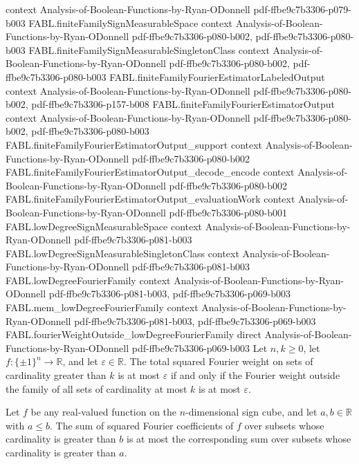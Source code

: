 \begin{theorem}
  {context}
  {Analysis-of-Boolean-Functions-by-Ryan-ODonnell}
  {pdf-ffbe9c7b3306-p079-b003}
\proofstep
  {FABL.finiteFamilySignMeasurableSpace}
  {context}
  {Analysis-of-Boolean-Functions-by-Ryan-ODonnell}
  {pdf-ffbe9c7b3306-p080-b002,
    pdf-ffbe9c7b3306-p080-b003}
\proofstep
  {FABL.finiteFamilySignMeasurableSingletonClass}
  {context}
  {Analysis-of-Boolean-Functions-by-Ryan-ODonnell}
  {pdf-ffbe9c7b3306-p080-b002,
    pdf-ffbe9c7b3306-p080-b003}
\proofstep
  {FABL.finiteFamilyFourierEstimatorLabeledOutput}
  {context}
  {Analysis-of-Boolean-Functions-by-Ryan-ODonnell}
  {pdf-ffbe9c7b3306-p080-b002,
    pdf-ffbe9c7b3306-p157-b008}
\proofstep
  {FABL.finiteFamilyFourierEstimatorOutput}
  {context}
  {Analysis-of-Boolean-Functions-by-Ryan-ODonnell}
  {pdf-ffbe9c7b3306-p080-b002,
    pdf-ffbe9c7b3306-p080-b003}
\proofstep
  {FABL.finiteFamilyFourierEstimatorOutput_support}
  {context}
  {Analysis-of-Boolean-Functions-by-Ryan-ODonnell}
  {pdf-ffbe9c7b3306-p080-b002}
\proofstep
  {FABL.finiteFamilyFourierEstimatorOutput_decode_encode}
  {context}
  {Analysis-of-Boolean-Functions-by-Ryan-ODonnell}
  {pdf-ffbe9c7b3306-p080-b002}
\proofstep
  {FABL.finiteFamilyFourierEstimatorOutput_evaluationWork}
  {context}
  {Analysis-of-Boolean-Functions-by-Ryan-ODonnell}
  {pdf-ffbe9c7b3306-p080-b001}
\proofstep
  {FABL.lowDegreeSignMeasurableSpace}
  {context}
  {Analysis-of-Boolean-Functions-by-Ryan-ODonnell}
  {pdf-ffbe9c7b3306-p081-b003}
\proofstep
  {FABL.lowDegreeSignMeasurableSingletonClass}
  {context}
  {Analysis-of-Boolean-Functions-by-Ryan-ODonnell}
  {pdf-ffbe9c7b3306-p081-b003}
\proofstep
  {FABL.lowDegreeFourierFamily}
  {context}
  {Analysis-of-Boolean-Functions-by-Ryan-ODonnell}
  {pdf-ffbe9c7b3306-p081-b003,
    pdf-ffbe9c7b3306-p069-b003}
\proofstep
  {FABL.mem_lowDegreeFourierFamily}
  {context}
  {Analysis-of-Boolean-Functions-by-Ryan-ODonnell}
  {pdf-ffbe9c7b3306-p081-b003,
    pdf-ffbe9c7b3306-p069-b003}
\proofstep
  {FABL.fourierWeightOutside_lowDegreeFourierFamily}
  {direct}
  {Analysis-of-Boolean-Functions-by-Ryan-ODonnell}
  {pdf-ffbe9c7b3306-p069-b003}
Let $n,k\ge 0$, let $f:\{\pm1\}^n\to\mathbb R$, and let $\varepsilon\in\mathbb R$. The
total squared Fourier weight on sets of cardinality greater than $k$ is at most
$\varepsilon$ if and only if the Fourier weight outside the family of all sets of
cardinality at most $k$ is at most $\varepsilon$.
\end{theorem}

\begin{theorem}
\label{FABL.fourierWeightAboveReal_antitone}
\leanok
{}
Let $f$ be any real-valued function on the $n$-dimensional sign cube, and let
$a,b\in\mathbb{R}$ with $a\le b$. The sum of squared Fourier coefficients of $f$ over
subsets whose cardinality is greater than $b$ is at most the corresponding sum over
subsets whose cardinality is greater than $a$.
\end{theorem}

